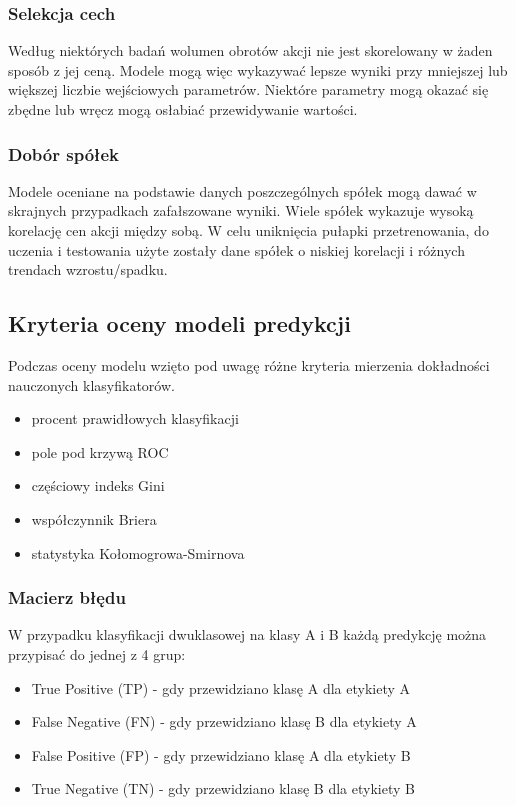\documentclass[a4paper, twoside, 11pt, openright]{article}
\begin{document}
\subsubsection{Selekcja cech}

Według niektórych badań wolumen obrotów akcji nie jest skorelowany w żaden sposób z jej ceną. Modele mogą więc wykazywać lepsze wyniki przy mniejszej lub większej liczbie wejściowych parametrów. Niektóre parametry mogą okazać się zbędne lub wręcz mogą osłabiać przewidywanie wartości.

\subsubsection{Dobór spółek}

Modele oceniane na podstawie danych poszczególnych spółek mogą dawać w skrajnych przypadkach zafałszowane wyniki. Wiele spółek wykazuje wysoką korelację cen akcji między sobą. W celu uniknięcia pułapki przetrenowania, do uczenia i testowania użyte zostały dane spółek o niskiej korelacji i różnych trendach wzrostu/spadku.

\subsection{Kryteria oceny modeli predykcji}

Podczas oceny modelu wzięto pod uwagę różne kryteria mierzenia dokładności nauczonych klasyfikatorów.
\begin{itemize}
\item procent prawidłowych klasyfikacji
\item pole pod krzywą ROC
\item częściowy indeks Gini
\item współczynnik Briera
\item statystyka Kołomogrowa-Smirnova
\end{itemize}

\subsubsection{Macierz błędu}

W przypadku klasyfikacji dwuklasowej na klasy A i B każdą predykcję można przypisać do jednej z 4 grup:
\begin{itemize}
\item True Positive (TP) - gdy przewidziano klasę A dla etykiety A
\item False Negative (FN) - gdy przewidziano klasę B dla etykiety A
\item False Positive (FP) - gdy przewidziano klasę A dla etykiety B
\item True Negative (TN) - gdy przewidziano klasę B dla etykiety B
\end{itemize}
\end{document}

